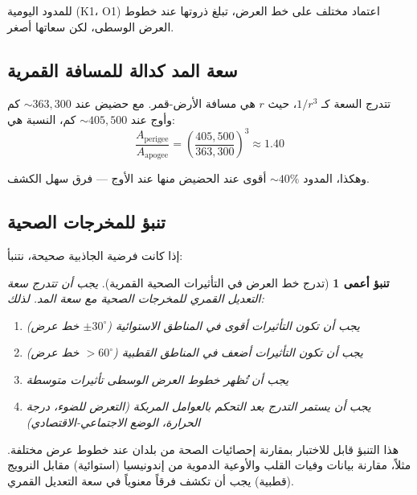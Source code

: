 \documentclass[11pt,a4paper]{article}
\newtheorem{prediction}[theorem]{تنبؤ أعمى}
\theoremstyle{remark}
\begin{document}
	للمدود اليومية (K1، O1) اعتماد مختلف على خط العرض، تبلغ ذروتها عند خطوط العرض الوسطى، لكن سعاتها أصغر.
	
	\subsection{سعة المد كدالة للمسافة القمرية}
	
	تتدرج السعة كـ $1/r^3$، حيث $r$ هي مسافة الأرض-قمر. مع حضيض عند $\sim 363,300$ كم وأوج عند $\sim 405,500$ كم، النسبة هي:
	\[
	\frac{A_{\text{perigee}}}{A_{\text{apogee}}} = \left(\frac{405,500}{363,300}\right)^3 \approx 1.40
	\]
	
	وهكذا، المدود $\sim 40\%$ أقوى عند الحضيض منها عند الأوج — فرق سهل الكشف.
	
	\subsection{تنبؤ للمخرجات الصحية}
	
	إذا كانت فرضية الجاذبية صحيحة، نتنبأ:
	
	\begin{prediction}[تدرج خط العرض في التأثيرات الصحية القمرية]
		يجب أن تتدرج سعة التعديل القمري للمخرجات الصحية مع سعة المد. لذلك:
		\begin{enumerate}
			\item يجب أن تكون التأثيرات أقوى في المناطق الاستوائية ($\pm 30^\circ$ خط عرض)
			\item يجب أن تكون التأثيرات أضعف في المناطق القطبية ($>60^\circ$ خط عرض)
			\item يجب أن تُظهر خطوط العرض الوسطى تأثيرات متوسطة
			\item يجب أن يستمر التدرج بعد التحكم بالعوامل المربكة (التعرض للضوء، درجة الحرارة، الوضع الاجتماعي-الاقتصادي)
		\end{enumerate}
	\end{prediction}
	
	هذا التنبؤ قابل للاختبار بمقارنة إحصائيات الصحة من بلدان عند خطوط عرض مختلفة. مثلاً، مقارنة بيانات وفيات القلب والأوعية الدموية من إندونيسيا (استوائية) مقابل النرويج (قطبية) يجب أن تكشف فرقاً معنوياً في سعة التعديل القمري.
	
\end{document}
